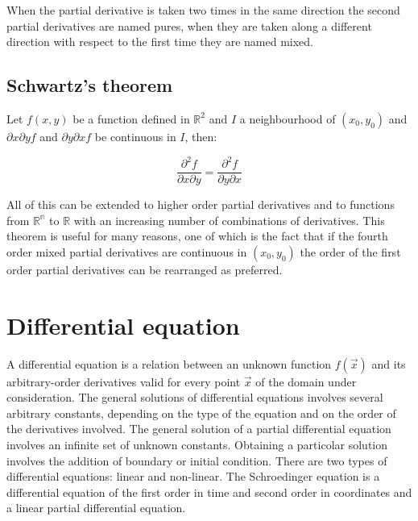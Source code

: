 When the partial derivative is taken two times in the same direction the second partial derivatives are named pures, when they are taken along a different direction with respect to the first time they are named mixed.

	\subsection{Schwartz's theorem}
	Let $f(x, y)$ be a function defined in $\mathbb{R}^2$ and $I$ a neighbourhood of $(x_0, y_0)$ and $\partial x\partial y f$ and $\partial y\partial x f$ be continuous in $I$, then:

	$$\frac{\partial^2 f}{\partial x\partial y} = \frac{\partial ^2 f}{\partial y\partial x}$$

	All of this can be extended to higher order partial derivatives and to functions from $\mathbb{R^n}$ to $\mathbb{R}$ with an increasing number of combinations of derivatives.
	This theorem is useful for many reasons, one of which is the fact that if the fourth order mixed partial derivatives are continuous in $(x_0, y_0)$ the order of the first order partial derivatives can be rearranged as preferred.

\section{Differential equation}
A differential equation is a relation between an unknown function $f(\vec{x})$ and its arbitrary-order derivatives valid for every point $\vec{x}$ of the domain under consideration.
The general solutions of differential equations involves several arbitrary constants, depending on the type of the equation and on the order of the derivatives involved.
The general solution of a partial differential equation involves an infinite set of unknown constants.
Obtaining a particolar solution involves the addition of boundary or initial condition.
There are two types of differential equations: linear and non-linear.
The Schroedinger equation is a differential equation of the first order in time and second order in coordinates and a linear partial differential equation.
